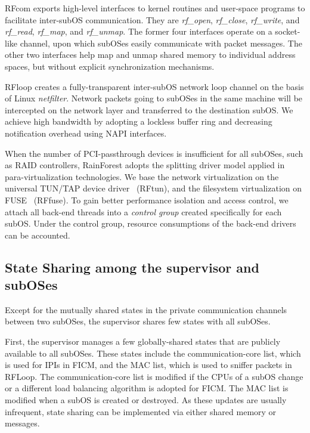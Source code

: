 \documentclass[pageno]{jpaper}
\begin{document}
RFcom exports high-level interfaces to kernel routines and user-space programs to facilitate inter-subOS communication. They are \emph{rf\_open}, \emph{rf\_close}, \emph{rf\_write}, and \emph{rf\_read}, \emph{rf\_map}, and \emph{rf\_unmap}. The former four interfaces operate on a socket-like channel, upon which subOSes easily communicate with packet messages. The other two interfaces help map  and unmap shared memory to individual address spaces, but without explicit synchronization mechanisms.

RFloop creates a fully-transparent inter-subOS network loop channel on the basis of Linux \emph{netfilter}. Network packets going to subOSes in the same machine will be intercepted on the network layer and transferred to the destination subOS. We achieve high bandwidth by adopting a lockless buffer ring and decreasing notification overhead using NAPI interfaces.

When the number of PCI-passthrough devices is insufficient for all subOSes, such as RAID controllers, RainForest adopts the splitting driver model applied in para-virtualization technologies. We base the network virtualization on the universal TUN/TAP device driver~\cite{tun_site} (RFtun), and the filesystem virtualization on FUSE~\cite{fuse_site} (RFfuse).
To gain better performance isolation and access control, we attach all back-end threads into a \emph{control group} created specifically for each subOS. Under the control group, resource consumptions of the back-end drivers can be accounted.

\subsection{State Sharing among the supervisor and subOSes}


Except for the mutually shared states in the private communication channels between two subOSes, the supervisor shares few states with all subOSes.


First, the supervisor manages a few globally-shared states that are publicly available to all subOSes. These states include the communication-core list, which is used for IPIs in FICM, and the MAC list, which is used to sniffer packets in RFLoop. The communication-core list is modified if the CPUs of a subOS change or a different load balancing algorithm is adopted for FICM. The MAC list is modified when a subOS is created or destroyed. As these updates are usually infrequent, state sharing can be implemented via either shared memory or messages.
\end{document}
